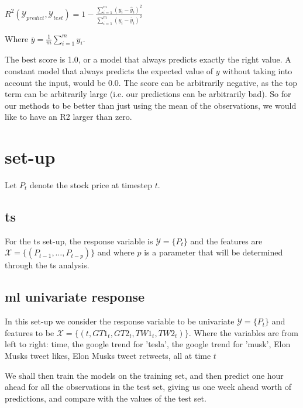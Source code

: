 $R^2(\mathcal{Y}_{predict},\mathcal{Y}_{test}) = 1 - \frac{\sum_{i=1}^m(y_i - \hat{y}_i)^2}{\sum_{i=1}^m(y_i - \bar{y}_i)^2}$

Where $\bar{y} = \frac{1}{m} \sum_{i=1}^m y_i$. %

The best score is 1.0, or a model that always predicts exactly the right value. A constant model that always predicts the expected value of $y$ without taking into account the input, would be 0.0. The score can be arbitrarily negative, as the top term can be arbitrarily large (i.e. our predictions can be arbitrarily bad). So for our methods to be better than just using the mean of the observations, we would like to have an \Gls{R2} larger than zero.

\section{set-up}
Let $P_{t}$ denote the stock price at timestep $t$.

\subsection{\acrlong{ts}}
For the \acrlong{ts} set-up, the response variable is $\mathcal{Y}=\{ P_{t} \}$ and the features are $\mathcal{X} = \{ (P_{t-1}, \dots, P_{t-p}) \}$ and where $p$ is a parameter that will be determined through the \acrlong{ts} analysis.

\subsection{\acrshort{ml} univariate response}
In this set-up we consider the response variable to be univariate $\mathcal{Y}=\{P_t\}$ and features to be $ \mathcal{X} = \{ (t,GT1_t,GT2_t,TW1_t,TW2_t)  \}$. Where the variables are from left to right: time, the google trend for 'tesla', the google trend for 'musk', Elon Musks tweet likes, Elon Musks tweet retweets, all at time $t$

We shall then train the models on the training set, and then predict one hour ahead for all the observations in the test set, giving us one week ahead worth of predictions, and compare with the values of the test set.

